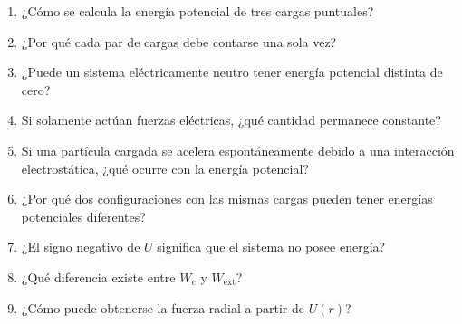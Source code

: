\begin{enumerate}
    \item ¿Cómo se calcula la energía potencial de tres cargas puntuales?

    \item ¿Por qué cada par de cargas debe contarse una sola vez?

    \item ¿Puede un sistema eléctricamente neutro tener energía potencial distinta de
    cero?

    \item Si solamente actúan fuerzas eléctricas, ¿qué cantidad permanece constante?

    \item Si una partícula cargada se acelera espontáneamente debido a una interacción
    electrostática, ¿qué ocurre con la energía potencial?

    \item ¿Por qué dos configuraciones con las mismas cargas pueden tener energías
    potenciales diferentes?

    \item ¿El signo negativo de \(U\) significa que el sistema no posee energía?

    \item ¿Qué diferencia existe entre \(W_e\) y \(W_{\text{ext}}\)?

    \item ¿Cómo puede obtenerse la fuerza radial a partir de \(U(r)\)?
\end{enumerate}


